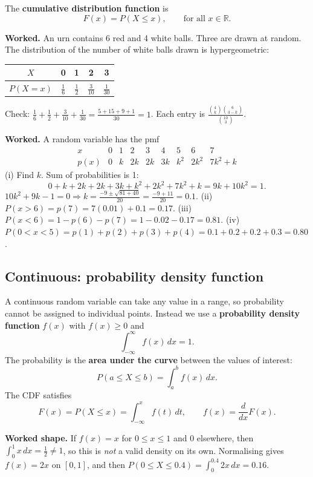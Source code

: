 \documentclass[11pt,a4paper]{article}
\begin{document}
The \textbf{cumulative distribution function} is
\[
F(x)=P(X\le x),\qquad \text{for all }x\in\mathbb{R}.
\]

\begin{exambox}
\textbf{Worked.} An urn contains 6 red and 4 white balls. Three are drawn at random. The distribution of the number of white balls drawn is hypergeometric:

\begin{center}\small
\begin{tabular}{c|cccc}
\toprule $X$ & 0 & 1 & 2 & 3\\\midrule
$P(X=x)$ & $\frac16$ & $\frac12$ & $\frac3{10}$ & $\frac1{30}$\\\bottomrule
\end{tabular}
\end{center}

Check: $\frac16+\frac12+\frac3{10}+\frac1{30}=\frac{5+15+9+1}{30}=1$. Each entry is $\frac{\binom4k\binom6{3-k}}{\binom{10}3}$.
\end{exambox}

\begin{exambox}
\textbf{Worked.} A random variable has the pmf
\[
\begin{array}{c|rrrrrrrr}
x & 0&1&2&3&4&5&6&7\\\hline
p(x) & 0&k&2k&2k&3k&k^2&2k^2&7k^2+k
\end{array}
\]
(i) Find $k$. Sum of probabilities is 1:
\[
0+k+2k+2k+3k+k^2+2k^2+7k^2+k=9k+10k^2=1.
\]
$10k^2+9k-1=0\Rightarrow k=\frac{-9\pm\sqrt{81+40}}{20}=\frac{-9+11}{20}=\boxed{0.1}$.
(ii) $P(x>6)=p(7)=7(0.01)+0.1=\boxed{0.17}$.
(iii) $P(x<6)=1-p(6)-p(7)=1-0.02-0.17=\boxed{0.81}$.
(iv) $P(0<x<5)=p(1)+p(2)+p(3)+p(4)=0.1+0.2+0.2+0.3=\boxed{0.80}$.
\end{exambox}

\subsection{Continuous: probability density function}
A continuous random variable can take any value in a range, so probability cannot be assigned to individual points. Instead we use a \textbf{probability density function} $f(x)$ with $f(x)\ge 0$ and
\[
\int_{-\infty}^{\infty} f(x)\,dx=1.
\]
The probability is the \textbf{area under the curve} between the values of interest:
\[
P(a\le X\le b)=\int_a^b f(x)\,dx.
\]
The CDF satisfies
\[
F(x)=P(X\le x)=\int_{-\infty}^{x} f(t)\,dt,\qquad f(x)=\frac{d}{dx}F(x).
\]

\begin{exambox}
\textbf{Worked shape.} If $f(x)=x$ for $0\le x\le 1$ and $0$ elsewhere, then $\int_0^1 x\,dx=\frac12\ne 1$, so this is \emph{not} a valid density on its own. Normalising gives $f(x)=2x$ on $[0,1]$, and then $P(0\le X\le 0.4)=\int_0^{0.4}2x\,dx=0.16$.
\end{exambox}
\end{document}
